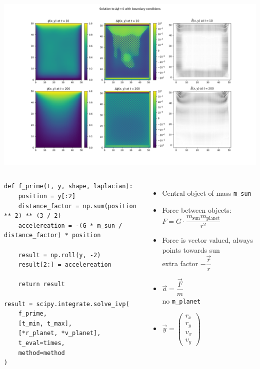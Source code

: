 
\begin{frame}
%
\includegraphics[width=\linewidth]{./gfx/07-Laplacian}
%
\end{frame}


\begin{frame}[fragile]
%
\begin{columns}
\begin{codebox}
\begin{verbatim}
def f_prime(t, y, shape, laplacian):
    position = y[:2]
    distance_factor = np.sum(position ** 2) ** (3 / 2)
    accelereation = -(G * m_sun / distance_factor) * position

    result = np.roll(y, -2)
    result[2:] = accelereation

    return result

result = scipy.integrate.solve_ivp(
    f_prime,
    [t_min, t_max], 
    [*r_planet, *v_planet],
    t_eval=times,
    method=method
)
\end{verbatim}
\end{codebox}
%
\begin{itemize}
\item Central object of mass \texttt{m\_sun}
\item Force between objects: $F = G \cdot \dfrac{m_{\text{sun}} m_{\text{planet}}}{r^2}$
\item Force is vector valued, always points towards sun\\
	\Thus extra factor $-\dfrac{\vec{r}}{r}$
\item $\vec{a} = \dfrac{\vec{F}}{m}$ \\
	\Thus no \texttt{m\_planet}
\item $\vec{y} = 
	\begin{pmatrix}
	r_x \\ r_y \\ v_x \\ v_y
	\end{pmatrix}$
\end{itemize}
\end{columns}
%
\end{frame}

